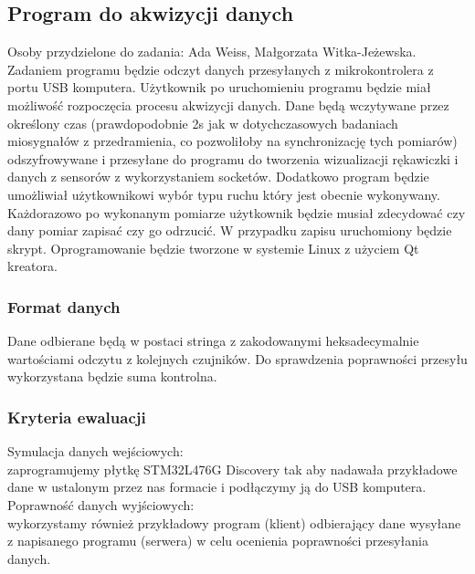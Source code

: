 \documentclass{article}
\begin{document}
\subsection{Program do akwizycji danych}
Osoby przydzielone do zadania: Ada Weiss, Małgorzata Witka-Jeżewska.\\
Zadaniem programu będzie odczyt danych przesyłanych z mikrokontrolera z portu USB komputera. Użytkownik po uruchomieniu programu będzie miał możliwość rozpoczęcia procesu akwizycji danych. Dane będą wczytywane przez określony czas (prawdopodobnie 2s jak w dotychczasowych badaniach miosygnałów z przedramienia, co pozwoliłoby na synchronizację tych pomiarów) odszyfrowywane i przesyłane do programu do tworzenia wizualizacji rękawiczki i danych z sensorów z wykorzystaniem socketów. Dodatkowo program będzie umożliwiał użytkownikowi wybór typu ruchu który jest obecnie wykonywany. Każdorazowo po wykonanym pomiarze użytkownik będzie musiał zdecydować czy dany pomiar zapisać czy go odrzucić. W przypadku zapisu uruchomiony będzie skrypt. Oprogramowanie będzie tworzone w systemie Linux z użyciem Qt kreatora.
\subsubsection{Format danych}
Dane odbierane będą w postaci stringa z zakodowanymi heksadecymalnie wartościami odczytu z kolejnych czujników. Do sprawdzenia poprawności przesyłu wykorzystana będzie suma kontrolna.
\subsubsection{Kryteria ewaluacji}
Symulacja danych wejściowych: \\
zaprogramujemy płytkę STM32L476G Discovery tak aby nadawała przykładowe dane w ustalonym przez nas formacie i podłączymy ją do USB komputera.  \\
Poprawność danych wyjściowych:\\
wykorzystamy również przykładowy program (klient) odbierający dane wysyłane z napisanego programu (serwera) w celu ocenienia poprawności przesyłania danych.\\
\end{document}
